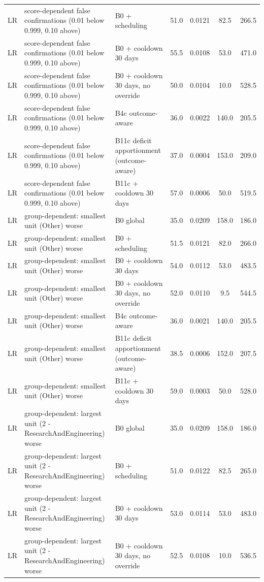 \documentclass[10pt,onecolumn,letterpaper]{article}
\begin{document}
\begin{longtable}{lp{5.2cm}p{4.4cm}cccc}
LR & score-dependent false confirmations (0.01 below 0.999, 0.10 above) & B0 + scheduling & 51.0 & 0.0121 & 82.5 & 266.5 \\
LR & score-dependent false confirmations (0.01 below 0.999, 0.10 above) & B0 + cooldown 30 days & 55.5 & 0.0108 & 53.0 & 471.0 \\
LR & score-dependent false confirmations (0.01 below 0.999, 0.10 above) & B0 + cooldown 30 days, no override & 50.0 & 0.0104 & 10.0 & 528.5 \\
LR & score-dependent false confirmations (0.01 below 0.999, 0.10 above) & B4c outcome-aware & 36.0 & 0.0022 & 140.0 & 205.5 \\
LR & score-dependent false confirmations (0.01 below 0.999, 0.10 above) & B11c deficit apportionment (outcome-aware) & 37.0 & 0.0004 & 153.0 & 209.0 \\
LR & score-dependent false confirmations (0.01 below 0.999, 0.10 above) & B11c + cooldown 30 days & 57.0 & 0.0006 & 50.0 & 519.5 \\
LR & group-dependent: smallest unit (Other) worse & B0 global & 35.0 & 0.0209 & 158.0 & 186.0 \\
LR & group-dependent: smallest unit (Other) worse & B0 + scheduling & 51.5 & 0.0121 & 82.0 & 266.0 \\
LR & group-dependent: smallest unit (Other) worse & B0 + cooldown 30 days & 54.0 & 0.0112 & 53.0 & 483.5 \\
LR & group-dependent: smallest unit (Other) worse & B0 + cooldown 30 days, no override & 52.0 & 0.0110 & 9.5 & 544.5 \\
LR & group-dependent: smallest unit (Other) worse & B4c outcome-aware & 36.0 & 0.0021 & 140.0 & 205.5 \\
LR & group-dependent: smallest unit (Other) worse & B11c deficit apportionment (outcome-aware) & 38.5 & 0.0006 & 152.0 & 207.5 \\
LR & group-dependent: smallest unit (Other) worse & B11c + cooldown 30 days & 59.0 & 0.0003 & 50.0 & 528.0 \\
LR & group-dependent: largest unit (2 - ResearchAndEngineering) worse & B0 global & 35.0 & 0.0209 & 158.0 & 186.0 \\
LR & group-dependent: largest unit (2 - ResearchAndEngineering) worse & B0 + scheduling & 51.0 & 0.0122 & 82.5 & 265.0 \\
LR & group-dependent: largest unit (2 - ResearchAndEngineering) worse & B0 + cooldown 30 days & 53.0 & 0.0114 & 53.0 & 483.0 \\
LR & group-dependent: largest unit (2 - ResearchAndEngineering) worse & B0 + cooldown 30 days, no override & 52.5 & 0.0108 & 10.0 & 536.5 \\

\end{longtable}
\end{document}
